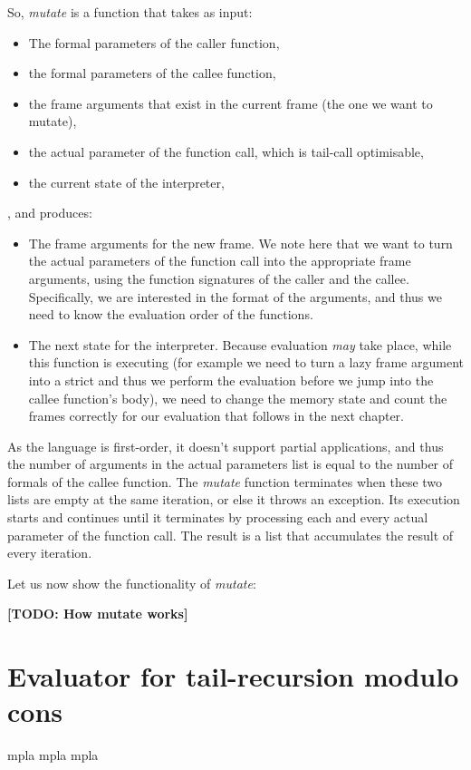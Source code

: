 \documentclass[diploma]{softlab-thesis}
\begin{document}
So, \textit{mutate} is a function that takes as input:
\begin{itemize}
  \item The formal parameters of the caller function,
  \item the formal parameters of the callee function,
  \item the frame arguments that exist in the current frame (the one we want to mutate),
  \item the actual parameter of the function call, which is tail-call optimisable,
  \item the current state of the interpreter, 
\end{itemize}
, and produces:
\begin{itemize}
  \item The frame arguments for the new frame. We note here that we want to turn the actual parameters 
  of the function call into the appropriate frame arguments, using the function signatures of the caller and the callee.
  Specifically, we are interested in the format of the arguments, and thus we need to know the evaluation 
  order of the functions.
  \item The next state for the interpreter. Because evaluation \textit{may} take place, while this function is executing 
  (for example we need to turn a lazy frame argument into a strict and thus we perform the evaluation before 
  we jump into the callee function's body), we need to change the memory state and count the frames correctly
  for our evaluation that follows in the next chapter.
\end{itemize}

As the language is first-order, it doesn't support partial applications, and thus the number of arguments 
in the actual parameters list is equal to the number of formals of the callee function. The \textit{mutate} function 
terminates when these two lists are empty at the same iteration, or else it throws an exception. Its execution starts 
and continues until it terminates by processing each and every actual parameter of the function call. The result is 
a list that accumulates the result of every iteration. 
\newline
\par Let us now show the functionality of \textit{mutate}:

\textbf{[TODO: How mutate works]}


\section {Evaluator for tail-recursion modulo cons}
mpla mpla mpla 
\end{document}
